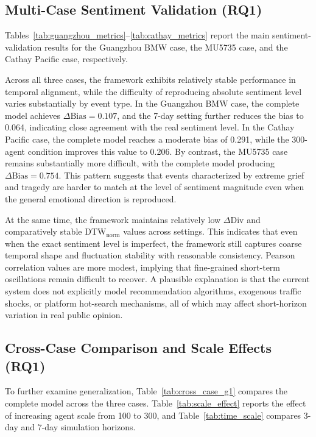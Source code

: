 \documentclass[11pt]{article}
\begin{document}
\subsection{Multi-Case Sentiment Validation (RQ1)}
Tables~\ref{tab:guangzhou_metrics}--\ref{tab:cathay_metrics} report the main sentiment-validation results for the Guangzhou BMW case, the MU5735 case, and the Cathay Pacific case, respectively.





Across all three cases, the framework exhibits relatively stable performance in temporal alignment, while the difficulty of reproducing absolute sentiment level varies substantially by event type. In the Guangzhou BMW case, the complete model achieves $\Delta\mathrm{Bias}=0.107$, and the 7-day setting further reduces the bias to 0.064, indicating close agreement with the real sentiment level. In the Cathay Pacific case, the complete model reaches a moderate bias of 0.291, while the 300-agent condition improves this value to 0.206. By contrast, the MU5735 case remains substantially more difficult, with the complete model producing $\Delta\mathrm{Bias}=0.754$. This pattern suggests that events characterized by extreme grief and tragedy are harder to match at the level of sentiment magnitude even when the general emotional direction is reproduced.

At the same time, the framework maintains relatively low $\Delta\mathrm{Div}$ and comparatively stable $\mathrm{DTW}_{\mathrm{norm}}$ values across settings. This indicates that even when the exact sentiment level is imperfect, the framework still captures coarse temporal shape and fluctuation stability with reasonable consistency. Pearson correlation values are more modest, implying that fine-grained short-term oscillations remain difficult to recover. A plausible explanation is that the current system does not explicitly model recommendation algorithms, exogenous traffic shocks, or platform hot-search mechanisms, all of which may affect short-horizon variation in real public opinion.

\subsection{Cross-Case Comparison and Scale Effects (RQ1)}
To further examine generalization, Table~\ref{tab:cross_case_g1} compares the complete model across the three cases. Table~\ref{tab:scale_effect} reports the effect of increasing agent scale from 100 to 300, and Table~\ref{tab:time_scale} compares 3-day and 7-day simulation horizons.
\end{document}
